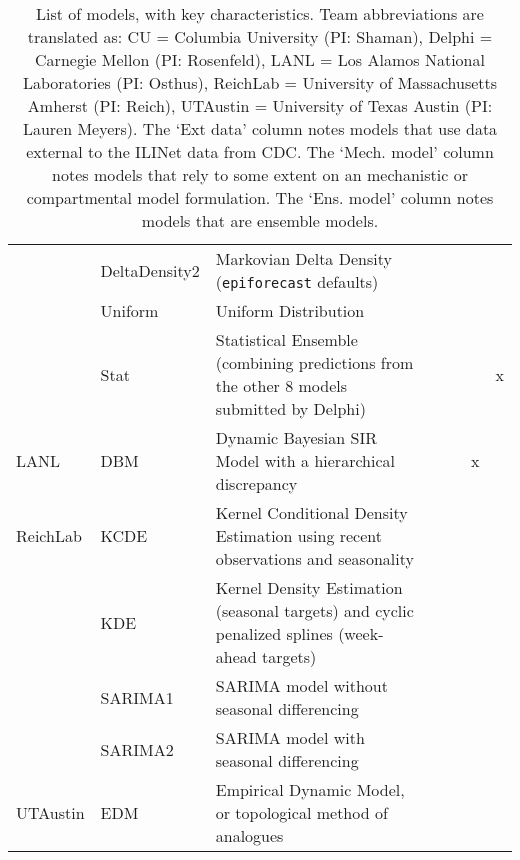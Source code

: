 \begin{table}
\begin{tabular}{p{1.6cm} l p{7.5cm} l  p{1cm}  p{1cm} p{1cm}}
~        & DeltaDensity2      & Markovian Delta Density ({\tt epiforecast} defaults)& \cite{Brooks2015a} & ~             & ~          &          \\ 
~        & Uniform            & Uniform Distribution&  & ~             & ~   &                 \\ 
~        & Stat               & Statistical Ensemble (combining predictions from the other 8 models submitted by Delphi)& & ~             & ~  & x                 \\
\hline
LANL     & DBM                & Dynamic Bayesian SIR Model with a hierarchical discrepancy & \cite{Osthus2017} & ~             & x      &              \\ 
\hline
ReichLab & KCDE               & Kernel Conditional Density Estimation using recent observations and seasonality & \cite{Ray2017}  & ~             & ~            &        \\ 
~        & KDE                & Kernel Density Estimation (seasonal targets) and cyclic penalized splines (week-ahead targets) & \cite{Ray2018}  & ~             & ~     &               \\ 
~        & SARIMA1            & SARIMA model without seasonal differencing & \cite{Ray2018} & ~             & ~      &              \\ 
~        & SARIMA2            & SARIMA model with seasonal differencing & \cite{Ray2018} & ~             & ~           &         \\ 
\hline
UTAustin & EDM                & Empirical Dynamic Model, or topological method of analogues & & ~             & ~         &           \\ 
\end{tabular}
\caption{List of models, with key characteristics. Team abbreviations are translated as: CU = Columbia University (PI: Shaman), Delphi = Carnegie Mellon (PI: Rosenfeld), LANL = Los Alamos National Laboratories (PI: Osthus), ReichLab = University of Massachusetts Amherst (PI: Reich), UTAustin = University of Texas Austin (PI: Lauren Meyers).  The `Ext data' column notes models that use data external to the ILINet data from CDC. The `Mech. model' column notes models that rely to some extent on an mechanistic or compartmental model formulation. The `Ens. model' column notes models that are ensemble models.}
\label{tab:model-list}
\end{table}